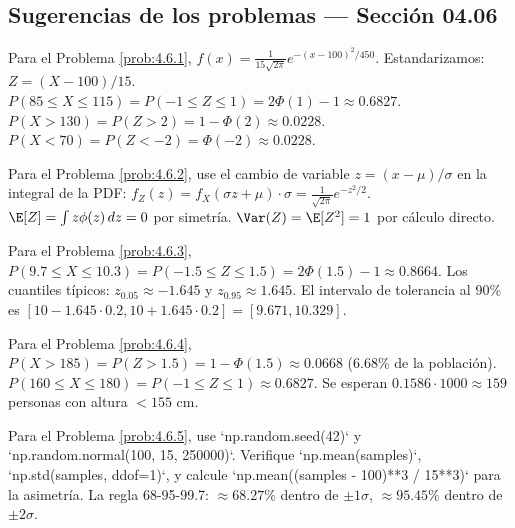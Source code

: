 \subsection*{Sugerencias de los problemas --- Sección 04.06}

\begin{sugerencia}
	\label{sug:4.6.1}
	Para el Problema \ref{prob:4.6.1}, $f(x) = \frac{1}{15\sqrt{2\pi}} e^{-(x-100)^{2}/450}$. Estandarizamos: $Z = (X-100)/15$. $P(85 \le X \le 115) = P(-1 \le Z \le 1) = 2\Phi(1) - 1 \approx 0.6827$. $P(X > 130) = P(Z > 2) = 1 - \Phi(2) \approx 0.0228$. $P(X < 70) = P(Z < -2) = \Phi(-2) \approx 0.0228$.
\end{sugerencia}

\begin{sugerencia}
	\label{sug:4.6.2}
	Para el Problema \ref{prob:4.6.2}, use el cambio de variable $z = (x - \mu)/\sigma$ en la integral de la PDF: $f_{Z}(z) = f_{X}(\sigma z + \mu) \cdot \sigma = \frac{1}{\sqrt{2\pi}} e^{-z^{2}/2}$. $\E[Z] = \int z \phi(z)\,dz = 0$ por simetría. $\Var(Z) = \E[Z^{2}] = 1$ por cálculo directo.
\end{sugerencia}

\begin{sugerencia}
	\label{sug:4.6.3}
	Para el Problema \ref{prob:4.6.3}, $P(9.7 \le X \le 10.3) = P(-1.5 \le Z \le 1.5) = 2\Phi(1.5) - 1 \approx 0.8664$. Los cuantiles típicos: $z_{0.05} \approx -1.645$ y $z_{0.95} \approx 1.645$. El intervalo de tolerancia al 90\% es $[10 - 1.645 \cdot 0.2, 10 + 1.645 \cdot 0.2] = [9.671, 10.329]$.
\end{sugerencia}

\begin{sugerencia}
	\label{sug:4.6.4}
	Para el Problema \ref{prob:4.6.4}, $P(X > 185) = P(Z > 1.5) = 1 - \Phi(1.5) \approx 0.0668$ (6.68\% de la población). $P(160 \le X \le 180) = P(-1 \le Z \le 1) \approx 0.6827$. Se esperan $0.1586 \cdot 1000 \approx 159$ personas con altura $< 155$ cm.
\end{sugerencia}

\begin{sugerencia}
	\label{sug:4.6.5}
	Para el Problema \ref{prob:4.6.5}, use `np.random.seed(42)` y `np.random.normal(100, 15, 250000)`. Verifique `np.mean(samples)`, `np.std(samples, ddof=1)`, y calcule `np.mean((samples - 100)**3 / 15**3)` para la asimetría. La regla 68-95-99.7: $\approx 68.27\%$ dentro de $\pm 1\sigma$, $\approx 95.45\%$ dentro de $\pm 2\sigma$.
\end{sugerencia}

